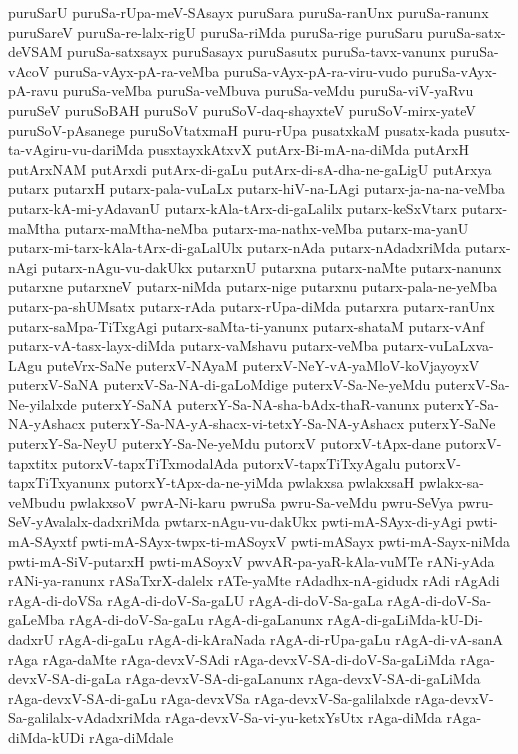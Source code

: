 {puruSarU
puruSa-rUpa-meV-SAsayx
puruSara
puruSa-ranUnx
puruSa-ranunx
puruSareV
puruSa-re-lalx-rigU
puruSa-riMda
puruSa-rige
puruSaru
puruSa-satx-deVSAM
puruSa-satxsayx
puruSasayx
puruSasutx
puruSa-tavx-vanunx
puruSa-vAcoV
puruSa-vAyx-pA-ra-veMba
puruSa-vAyx-pA-ra-viru-vudo
puruSa-vAyx-pA-ravu
puruSa-veMba
puruSa-veMbuva
puruSa-veMdu
puruSa-viV-yaRvu
puruSeV
puruSoBAH
puruSoV
puruSoV-daq-shayxteV
puruSoV-mirx-yateV
puruSoV-pAsanege
puruSoVtatxmaH
puru-rUpa
pusatxkaM
pusatx-kada
pusutx-ta-vAgiru-vu-dariMda
pusxtayxkAtxvX
putArx-Bi-mA-na-diMda
putArxH
putArxNAM
putArxdi
putArx-di-gaLu
putArx-di-sA-dha-ne-gaLigU
putArxya
putarx
putarxH
putarx-pala-vuLaLx
putarx-hiV-na-LAgi
putarx-ja-na-na-veMba
putarx-kA-mi-yAdavanU
putarx-kAla-tArx-di-gaLalilx
putarx-keSxVtarx
putarx-maMtha
putarx-maMtha-neMba
putarx-ma-nathx-veMba
putarx-ma-yanU
putarx-mi-tarx-kAla-tArx-di-gaLalUlx
putarx-nAda
putarx-nAdadxriMda
putarx-nAgi
putarx-nAgu-vu-dakUkx
putarxnU
putarxna
putarx-naMte
putarx-nanunx
putarxne
putarxneV
putarx-niMda
putarx-nige
putarxnu
putarx-pala-ne-yeMba
putarx-pa-shUMsatx
putarx-rAda
putarx-rUpa-diMda
putarxra
putarx-ranUnx
putarx-saMpa-TiTxgAgi
putarx-saMta-ti-yanunx
putarx-shataM
putarx-vAnf
putarx-vA-tasx-layx-diMda
putarx-vaMshavu
putarx-veMba
putarx-vuLaLxva-LAgu
puteVrx-SaNe
puterxV-NAyaM
puterxV-NeY-vA-yaMloV-koVjayoyxV
puterxV-SaNA
puterxV-Sa-NA-di-gaLoMdige
puterxV-Sa-Ne-yeMdu
puterxV-Sa-Ne-yilalxde
puterxY-SaNA
puterxY-Sa-NA-sha-bAdx-thaR-vanunx
puterxY-Sa-NA-yAshacx
puterxY-Sa-NA-yA-shacx-vi-tetxY-Sa-NA-yAshacx
puterxY-SaNe
puterxY-Sa-NeyU
puterxY-Sa-Ne-yeMdu
putorxV
putorxV-tApx-dane
putorxV-tapxtitx
putorxV-tapxTiTxmodalAda
putorxV-tapxTiTxyAgalu
putorxV-tapxTiTxyanunx
putorxY-tApx-da-ne-yiMda
pwlakxsa
pwlakxsaH
pwlakx-sa-veMbudu
pwlakxsoV
pwrA-Ni-karu
pwruSa
pwru-Sa-veMdu
pwru-SeVya
pwru-SeV-yAvalalx-dadxriMda
pwtarx-nAgu-vu-dakUkx
pwti-mA-SAyx-di-yAgi
pwti-mA-SAyxtf
pwti-mA-SAyx-twpx-ti-mASoyxV
pwti-mASayx
pwti-mA-Sayx-niMda
pwti-mA-SiV-putarxH
pwti-mASoyxV
pwvAR-pa-yaR-kAla-vuMTe
rANi-yAda
rANi-ya-ranunx
rASaTxrX-dalelx
rATe-yaMte
rAdadhx-nA-gidudx
rAdi
rAgAdi
rAgA-di-doVSa
rAgA-di-doV-Sa-gaLU
rAgA-di-doV-Sa-gaLa
rAgA-di-doV-Sa-gaLeMba
rAgA-di-doV-Sa-gaLu
rAgA-di-gaLanunx
rAgA-di-gaLiMda-kU-Di-dadxrU
rAgA-di-gaLu
rAgA-di-kAraNada
rAgA-di-rUpa-gaLu
rAgA-di-vA-sanA
rAga
rAga-daMte
rAga-devxV-SAdi
rAga-devxV-SA-di-doV-Sa-gaLiMda
rAga-devxV-SA-di-gaLa
rAga-devxV-SA-di-gaLanunx
rAga-devxV-SA-di-gaLiMda
rAga-devxV-SA-di-gaLu
rAga-devxVSa
rAga-devxV-Sa-galilalxde
rAga-devxV-Sa-galilalx-vAdadxriMda
rAga-devxV-Sa-vi-yu-ketxYsUtx
rAga-diMda
rAga-diMda-kUDi
rAga-diMdale
}
